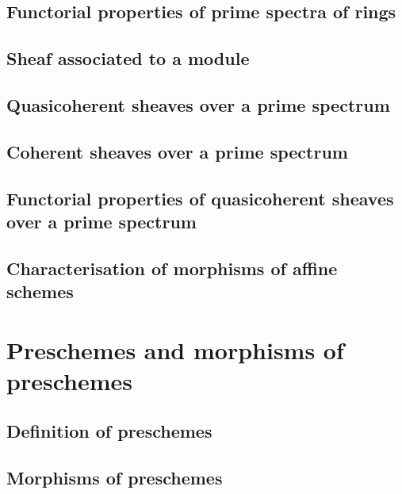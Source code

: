         \subsection{Functorial properties of prime spectra of rings}
        
       
        \subsection{Sheaf associated to a module}
        
       
        \subsection{Quasicoherent sheaves over a prime spectrum}
        
      
        \subsection{Coherent sheaves over a prime spectrum}
        
       
        \subsection{Functorial properties of quasicoherent sheaves over a prime spectrum}
        
       
        \subsection{Characterisation of morphisms of affine schemes}
        

    \section{Preschemes and morphisms of preschemes}

        \subsection{Definition of preschemes}
        

        \subsection{Morphisms of preschemes}
        

